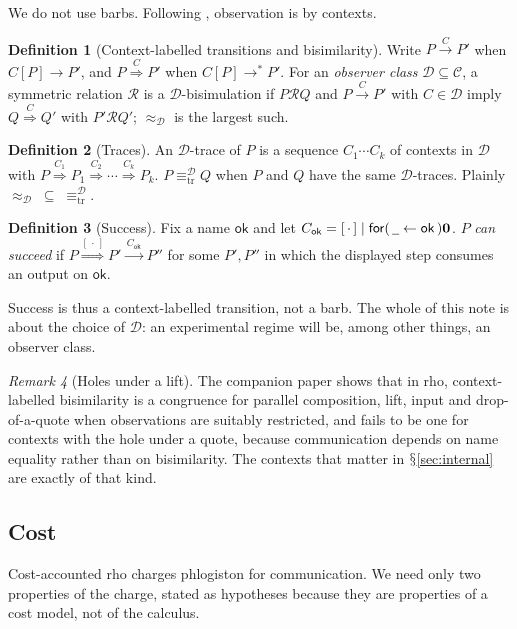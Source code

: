 \documentclass[11pt]{article}
\theoremstyle{definition}
\newtheorem{definition}{Definition}[section]
\theoremstyle{plain}
\theoremstyle{remark}
\newtheorem{remark}[definition]{Remark}
\newcommand{\inp}[3]{\mathsf{for}(\,#1 \leftarrow #2\,)#3}
\newcommand{\nil}{\mathbf{0}}
\newcommand{\Ctx}{\mathcal{C}}
\newcommand{\Obs}{\mathcal{D}}
\newcommand{\bisim}{\approx}
\newcommand{\treq}{\equiv_{\mathrm{tr}}}
\newcommand{\wild}{\mathord{\underline{\hspace{0.5em}}}}
\DeclareRobustCommand{\S}{\ifmmode\mathsection\else$\mathsection$\fi}
\newcommand{\hole}{[\,\cdot\,]}
\newcommand{\ok}{\mathsf{ok}}
\newcommand{\Lab}[1]{\xrightarrow{\,#1\,}}
\newcommand{\WLab}[1]{\overset{#1}{\Longrightarrow}}
\begin{document}
We do not use barbs. Following \cite{NWNS}, observation is by contexts.

\begin{definition}[Context-labelled transitions and bisimilarity]
\label{def:clbisim}
Write $P \Lab{C} P'$ when $C[P] \to P'$, and $P \WLab{C} P'$ when $C[P]
\to^* P'$. For an \emph{observer class} $\Obs \subseteq \Ctx$, a symmetric
relation $\mathcal{R}$ is a $\Obs$-bisimulation if $P \mathrel{\mathcal{R}}
Q$ and $P \Lab{C} P'$ with $C \in \Obs$ imply $Q \WLab{C} Q'$ with $P'
\mathrel{\mathcal{R}} Q'$; $\bisim_\Obs$ is the largest such.
\end{definition}

\begin{definition}[Traces]
An $\Obs$-trace of $P$ is a sequence $C_1 \cdots C_k$ of contexts in
$\Obs$ with $P \WLab{C_1} P_1 \WLab{C_2} \cdots \WLab{C_k} P_k$. $P
\treq^\Obs Q$ when $P$ and $Q$ have the same $\Obs$-traces. Plainly
$\bisim_\Obs \;\subseteq\; \treq^\Obs$.
\end{definition}

\begin{definition}[Success]\label{def:success}
Fix a name $\ok$ and let $C_\ok = \hole \mid \inp{\wild}{\ok}{\nil}$.
$P$ \emph{can succeed} if $P \WLab{\hole} P' \Lab{C_\ok} P''$ for some
$P', P''$ in which the displayed step consumes an output on $\ok$.
\end{definition}

Success is thus a context-labelled transition, not a barb. The whole of
this note is about the choice of $\Obs$: an experimental regime will be,
among other things, an observer class.

\begin{remark}[Holes under a lift]\label{rem:bihol}
The companion paper \cite{BIHOL} shows that in rho, context-labelled
bisimilarity is a congruence for parallel composition, lift, input and
drop-of-a-quote when observations are suitably restricted, and fails to
be one for contexts with the hole under a quote, because communication
depends on name equality rather than on bisimilarity. The contexts that
matter in \S\ref{sec:internal} are exactly of that kind.
\end{remark}

\subsection{Cost}

Cost-accounted rho charges phlogiston for communication. We need only two
properties of the charge, stated as hypotheses because they are
properties of a cost model, not of the calculus.
\end{document}

